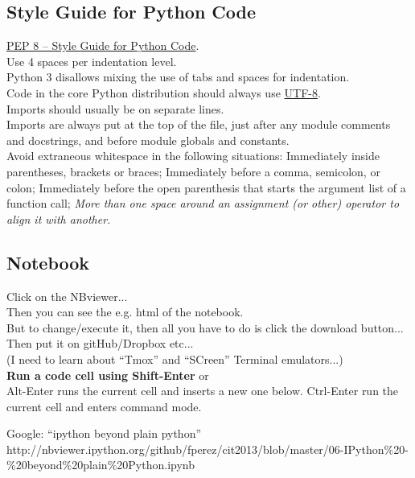 \documentclass[11pt,a4paper]{article}
\begin{document}
    \subsection{Style Guide for Python Code}
    \href{https://www.python.org/dev/peps/pep-0008/}{PEP 8 -- Style Guide for Python Code}.\\
    Use 4 spaces per indentation level.\\
    Python 3 disallows mixing the use of tabs and spaces for indentation.\\
    Code in the core Python distribution should always use \href{https://en.wikipedia.org/wiki/UTF-8}{UTF-8}. \\
    Imports should usually be on separate lines. \\
    Imports are always put at the top of the file, just after any module comments and docstrings, and before module globals and constants.\\
    Avoid extraneous whitespace in the following situations: Immediately inside parentheses, brackets or braces; Immediately before a comma, semicolon, or colon; Immediately before the open parenthesis that starts the argument list of a function call; {\it More than one space around an assignment (or other) operator to align it with another.}\\



    \subsection{Notebook}
    Click on the NBviewer...\\
    Then you can see the e.g. html of the notebook. \\
    But to change/execute it, then all you have to do is click the download button...\\
    Then put it on gitHub/Dropbox etc...\\
    (I need to learn about ``Tmox'' and ``SCreen'' Terminal emulators...)\\
  
    \noindent
    {\bf Run a code cell using Shift-Enter} or \\
    Alt-Enter runs the current cell and inserts a new one below.
    Ctrl-Enter run the current cell and enters command mode. 

    \noindent
    Google: ``ipython beyond plain python''\\
    
    http://nbviewer.ipython.org/github/fperez/cit2013/blob/master/06-IPython\%20-\%20beyond\%20plain\%20Python.ipynb
\end{document}
